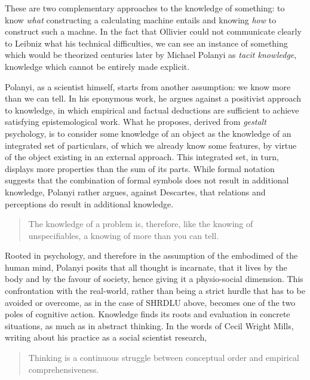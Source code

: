 These are two complementary approaches to the knowledge of something: to know \emph{what} constructing a calculating machine entails and knowing \emph{how} to construct such a machne. In the fact that Ollivier could not communicate clearly to Leibniz what his technical difficulties, we can see an instance of something which would be theorized centuries later by Michael Polanyi as \emph{tacit knowledge}, knowledge which cannot be entirely made explicit.

Polanyi, as a scientist himself, starts from another assumption: we know more than we can tell. In his eponymous work, he argues against a positivist approach to knowledge, in which empirical and factual deductions are sufficient to achieve satisfying epistemological work. What he proposes, derived from \emph{gestalt} psychology, is to consider some knowledge of an object as the knowledge of an integrated set of particulars, of which we already know some features, by virtue of the object existing in an external approach. This integrated set, in turn, displays more properties than the sum of its parts. While formal notation suggests that the combination of formal symbols does not result in additional knowledge, Polanyi rather argues, against Descartes, that relations and perceptions do result in additional knowledge.

\begin{quote}
    The knowledge of a problem is, therefore, like the knowing of unspecifiables, a knowing of more than you can tell. \citep{polanyi_knowing_1969}
\end{quote}

Rooted in psychology, and therefore in the assumption of the embodimed of the human mind, Polanyi posits that all thought is incarnate, that it lives by the body and by the favour of society, hence giving it a physio-social dimension. This confrontation with the real-world, rather than being a strict hurdle that has to be avoided or overcome, as in the case of SHRDLU above, becomes one of the two poles of cognitive action. Knowledge finds its roots and evaluation in concrete situations, as much as in abstract thinking. In the words of Cecil Wright Mills, writing about his practice as a social scientist research,

\begin{quote}
    Thinking is a continuous struggle between conceptual order and empirical comprehensiveness. \citep{MillsC.WrightCharlesWright2000Tsi}
\end{quote}

